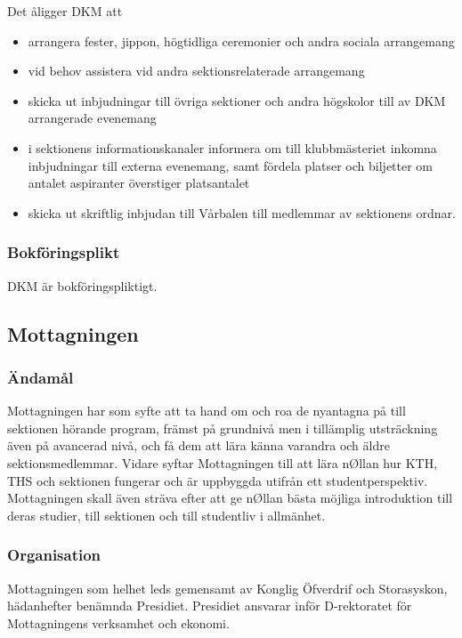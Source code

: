 \documentclass{dgovdoc}
\begin{document}
Det åligger DKM att

\begin{itemize}
  \item arrangera fester, jippon, högtidliga ceremonier och andra sociala
    arrangemang
  \item vid behov assistera vid andra sektionsrelaterade arrangemang
  \item skicka ut inbjudningar till övriga sektioner och andra högskolor till
    av DKM arrangerade evenemang
  \item i sektionens informationskanaler informera om till klubbmästeriet
    inkomna inbjudningar till externa evenemang, samt fördela platser och
    biljetter om antalet aspiranter överstiger platsantalet
  \item skicka ut skriftlig inbjudan till Vårbalen till medlemmar av sektionens
    ordnar.
\end{itemize}

\subsubsection{Bokföringsplikt}

DKM är bokföringspliktigt.

\subsection{Mottagningen}

\subsubsection{Ändamål}

Mottagningen har som syfte att ta hand om och roa de nyantagna på till
sektionen hörande program, främst på grundnivå men i tillämplig utsträckning
även på avancerad nivå, och få dem att lära känna varandra och äldre
sektionsmedlemmar. Vidare syftar Mottagningen till att lära nØllan hur KTH, THS
och sektionen fungerar och är uppbyggda utifrån ett studentperspektiv.
Mottagningen skall även sträva efter att ge nØllan bästa möjliga introduktion
till deras studier, till sektionen och till studentliv i allmänhet.

\subsubsection{Organisation}

Mottagningen som helhet leds gemensamt av Konglig Öfverdrif och Storasyskon, hädanhefter 
benämnda Presidiet. Presidiet ansvarar inför D-rektoratet för Mottagningens verksamhet och ekonomi.
\end{document}
